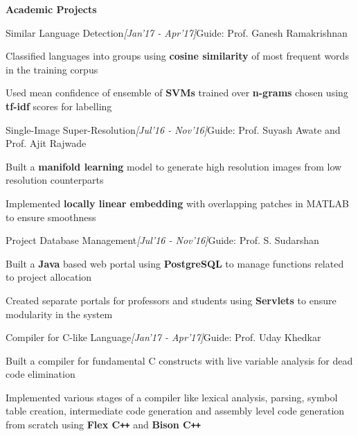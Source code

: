 \documentclass[a4paper,10pt]{resume}%
\begin{document}
\begin{rSection}{{\textbf{Academic Projects}}}
\begin{rSubsection}{{Similar Language Detection}}{\sl \small[Jan'17 - Apr'17]}{Guide: Prof. Ganesh Ramakrishnan}
\vspace{-1.0mm}
\item Classified languages into groups using \textbf{cosine similarity} of most frequent words in the training corpus
\item Used mean confidence of ensemble of \textbf{SVMs} trained over \textbf{n-grams} chosen using \textbf{tf-idf} scores for labelling
\end{rSubsection}
\vspace{-2mm}
\begin{rSubsection}{{Single-Image Super-Resolution}}{\sl \small[Jul'16 - Nov'16]}{Guide: Prof. Suyash Awate and Prof. Ajit Rajwade}
\vspace{-1.0mm}
\item Built a \textbf{manifold learning} model to generate high resolution images from low resolution counterparts
\item Implemented \textbf{locally linear embedding} with overlapping patches  in MATLAB to ensure smoothness
\end{rSubsection}
\vspace{-2mm}
\begin{rSubsection}{{Project Database Management}}{\sl \small[Jul'16 - Nov'16]}{Guide: Prof. S. Sudarshan}
\vspace{-1.0mm}
\item Built a \textbf{Java} based web portal using \textbf{PostgreSQL} to manage functions related to project allocation
\item Created separate portals for professors and students using \textbf{Servlets} to ensure modularity in the system
\end{rSubsection}
\leavevmode \vspace{0mm}
\begin{rSubsection}{{Compiler for C-like Language}}{\sl \small[Jan'17 - Apr'17]}{Guide: Prof. Uday Khedkar}
\vspace{-1.0mm}
\item Built a compiler for fundamental C constructs with live variable analysis for dead code elimination
\item Implemented various stages of a compiler like lexical analysis, parsing, symbol table creation, intermediate code generation and assembly level code generation from scratch using {\bf Flex C\texttt{+}\texttt{+}} and {\bf Bison C\texttt{+}\texttt{+}}

\end{rSubsection}
\end{rSection}
\end{document}

